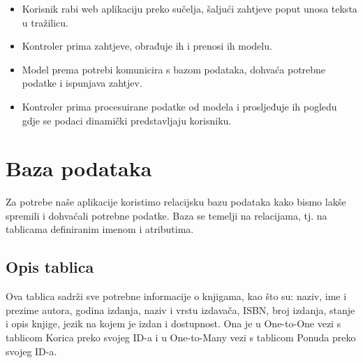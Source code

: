 		\begin{itemize}
			\item Korisnik rabi web aplikaciju preko sučelja, šaljući zahtjeve poput unosa teksta u tražilicu.
			\item Kontroler prima zahtjeve, obrađuje ih i prenosi ih modelu.
			\item Model prema potrebi komunicira s bazom podataka, dohvaća potrebne podatke i ispunjava zahtjev.
			\item Kontroler prima procesuirane podatke od modela i prosljeđuje ih pogledu gdje se podaci dinamički predstavljaju korisniku.
		\end{itemize}
				
		\section{Baza podataka}
			
			
		Za potrebe naše aplikacije koristimo relacijsku bazu podataka kako bismo lakše spremili i dohvaćali potrebne podatke. Baza se temelji na relacijama, tj. na tablicama definiranim imenom i atributima.
			
			\subsection{Opis tablica}
			
			
			Ova tablica sadrži sve potrebne informacije o knjigama, kao što su:
				naziv, ime i prezime autora, godina izdanja, naziv i vrstu izdavača, ISBN, broj
				izdanja, stanje i opis knjige, jezik na kojem je izdan i dostupnost. Ona je u
				One-to-One vezi s tablicom Korica preko svojeg ID-a i u One-to-Many vezi s tablicom Ponuda preko svojeg ID-a.
			
